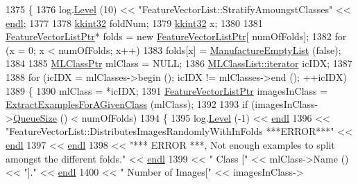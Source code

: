 \begin{DoxyCode}
1375 \{
1376   log.\hyperlink{class_k_k_b_1_1_run_log_a32cf761d7f2e747465fd80533fdbb659}{Level} (10) << \textcolor{stringliteral}{"FeatureVectorList::StratifyAmoungstClasses"} << \hyperlink{namespace_k_k_b_ad1f50f65af6adc8fa9e6f62d007818a8}{endl};
1377 
1378   \hyperlink{namespace_k_k_b_a8fa4952cc84fda1de4bec1fbdd8d5b1b}{kkint32}  foldNum;
1379   \hyperlink{namespace_k_k_b_a8fa4952cc84fda1de4bec1fbdd8d5b1b}{kkint32}  x;
1380 
1381   \hyperlink{class_k_k_m_l_l_1_1_feature_vector_list}{FeatureVectorListPtr}*  folds = \textcolor{keyword}{new} \hyperlink{class_k_k_m_l_l_1_1_feature_vector_list}{FeatureVectorListPtr}[
      numOfFolds];
1382   \textcolor{keywordflow}{for}  (x = 0; x < numOfFolds; x++)
1383     folds[x] =  \hyperlink{class_k_k_m_l_l_1_1_feature_vector_list_af533da1b34e4123f4fcb1343d5f48e37}{ManufactureEmptyList} (\textcolor{keyword}{false});
1384 
1385   \hyperlink{class_k_k_m_l_l_1_1_m_l_class}{MLClassPtr}  mlClass = NULL;
1386   \hyperlink{class_k_k_b_1_1_k_k_queue_aa3c2796a726eea468b94132a9fbf2cfe}{MLClassList::iterator}  icIDX;
1387 
1388   \textcolor{keywordflow}{for}  (icIDX = mlClasses->begin ();  icIDX != mlClasses->end ();  ++icIDX)
1389   \{
1390     mlClass = *icIDX;
1391     \hyperlink{class_k_k_m_l_l_1_1_feature_vector_list}{FeatureVectorListPtr}  imagesInClass = 
      \hyperlink{class_k_k_m_l_l_1_1_feature_vector_list_ab9c72c62046bf92e24e7e635d425792b}{ExtractExamplesForAGivenClass} (mlClass);
1392 
1393     \textcolor{keywordflow}{if}  (imagesInClass->\hyperlink{class_k_k_b_1_1_k_k_queue_a1dab601f75ee6a65d97f02bddf71c40d}{QueueSize} () < numOfFolds)
1394     \{
1395       log.\hyperlink{class_k_k_b_1_1_run_log_a32cf761d7f2e747465fd80533fdbb659}{Level} (-1) << \hyperlink{namespace_k_k_b_ad1f50f65af6adc8fa9e6f62d007818a8}{endl}
1396                      << \textcolor{stringliteral}{"FeatureVectorList::DistributesImagesRandomlyWithInFolds    ***ERROR***"} << 
      \hyperlink{namespace_k_k_b_ad1f50f65af6adc8fa9e6f62d007818a8}{endl}
1397                      << \hyperlink{namespace_k_k_b_ad1f50f65af6adc8fa9e6f62d007818a8}{endl}
1398                      << \textcolor{stringliteral}{"*** ERROR ***,  Not enough examples to split amongst the different folds."} << 
      \hyperlink{namespace_k_k_b_ad1f50f65af6adc8fa9e6f62d007818a8}{endl}
1399                      << \textcolor{stringliteral}{"                Class           ["} << mlClass->Name ()         << \textcolor{stringliteral}{"]."}  << 
      \hyperlink{namespace_k_k_b_ad1f50f65af6adc8fa9e6f62d007818a8}{endl}
1400                      << \textcolor{stringliteral}{"                Number of Images["} << imagesInClass->

\end{DoxyCode}
